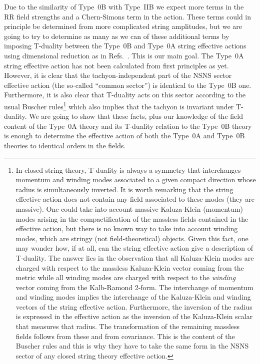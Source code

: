 \documentclass[12pt,a4paper]{article}
\begin{document}
Due to the similarity of Type~0B with Type~IIB we expect more terms in
the RR field strengths and a Chern-Simons term in the action. These
terms could in principle be determined from more complicated string
amplitudes, but we are going to try to determine as many as we can of
these additional terms by imposing T-duality between the Type~0B and
Type~0A string effective actions using dimensional reduction as in
Refs.~\cite{kn:BHO,kn:BRGPT,kn:MO}. This is our main goal.  The
Type~0A string effective action has not been calculated from first
principles as yet. However, it is clear that the tachyon-independent
part of the NSNS sector effective action (the so-called ``common
sector'') is identical to the Type~0B one.  Furthermore, it is also
clear that T-duality acts on this sector according to the usual
Buscher rules\footnote{In closed string theory, T-duality is always a
  symmetry that interchanges momentum and winding modes associated to
  a given compact direction whose radius is simultaneously inverted.
  It is worth remarking that the string effective action does not
  contain any field associated to these modes (they are massive). One
  could take into account massive Kaluza-Klein (momentum) modes
  arising in the compactification of the massless fields contained in
  the effective action, but there is no known way to take into account
  winding modes, which are stringy (not field-theoretical) objects.
  Given this fact, one may wonder how, if at all, can the string
  effective action give a description of T-duality. The answer lies in
  the observation that all Kaluza-Klein modes are charged with respect
  to the massless Kaluza-Klein vector coming from the metric while all
  winding modes are charged with respect to the {\it winding} vector
  coming from the Kalb-Ramond 2-form. The interchange of momentum and
  winding modes implies the interchange of the Kaluza-Klein and
  winding vectors of the string effective action. Furthermore, the
  inversion of the radius is expressed in the effective action as the
  inversion of the Kaluza-Klein scalar that measures that radius.  The
  transformation of the remaining massless fields follows from these
  and from covariance. This is the content of the Buscher rules and
  this is why they have to take the same form in the NSNS sector of
  any closed string theory effective action.}  \cite{kn:Bu} which also
implies that the tachyon is invariant under T-duality. We are going to
show that these facts, plus our knowledge of the field content of the
Type~0A theory and its T-duality relation to the Type~0B theory is
enough to determine the effective action of both the Type~0A and
Type~0B theories to identical orders in the fields.
\end{document}
